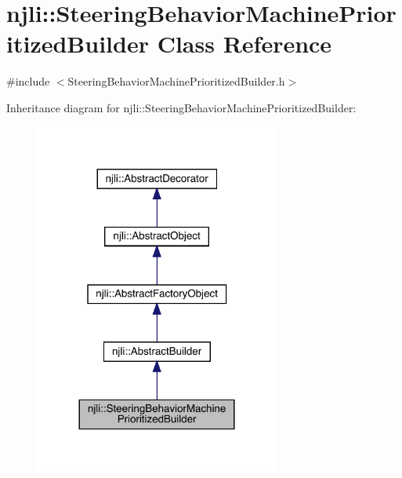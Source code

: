 \hypertarget{classnjli_1_1_steering_behavior_machine_prioritized_builder}{}\section{njli\+:\+:Steering\+Behavior\+Machine\+Prioritized\+Builder Class Reference}
\label{classnjli_1_1_steering_behavior_machine_prioritized_builder}


{\ttfamily \#include $<$Steering\+Behavior\+Machine\+Prioritized\+Builder.\+h$>$}



Inheritance diagram for njli\+:\+:Steering\+Behavior\+Machine\+Prioritized\+Builder\+:\nopagebreak
\begin{figure}[H]
\begin{center}
\leavevmode
\includegraphics[width=228pt]{classnjli_1_1_steering_behavior_machine_prioritized_builder__inherit__graph}
\end{center}
\end{figure}


